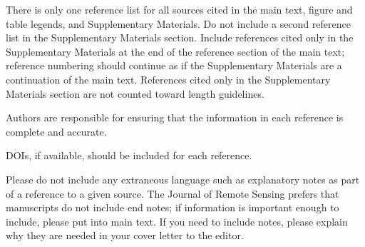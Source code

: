 \documentclass{article}
\begin{document}
There is only one reference list for all sources cited in the main text, figure and table legends, and Supplementary Materials. Do not include a second reference list in the Supplementary Materials section. Include references cited only in the Supplementary Materials at the end of the reference section of the main text; reference numbering should continue as if the Supplementary Materials are a continuation of the main text. References cited only in the Supplementary Materials section are not counted toward length guidelines.

Authors are responsible for ensuring that the information in each reference is complete and accurate.

DOIs, if available, should be included for each reference.

Please do not include any extraneous language such as explanatory notes as part of a reference to a given source. The Journal of Remote Sensing prefers that manuscripts do not include end notes; if information is important enough to include, please put into main text.  If you need to include notes, please explain why they are needed in your cover letter to the editor.

\printbibliography
\end{document}
